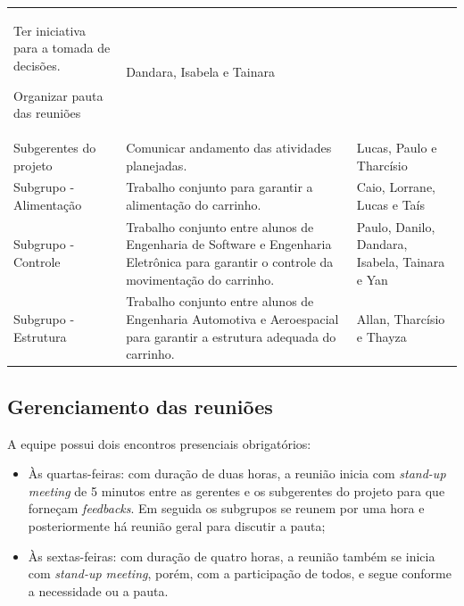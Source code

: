 \begin{table}[h]
{\begin{tabular}{ l l l }
{Ter iniciativa para a tomada de decisões.  			

Organizar pauta das reuniões } &
    \multicolumn{1}{p{2.417cm}|}{Dandara, Isabela e Tainara}
  \\  
  \cline{1-1}\cline{2-2}\cline{3-3}  
    \multicolumn{1}{|p{2.567cm}|}{Subgerentes do projeto} &
    \multicolumn{1}{p{6.433cm}|}{Comunicar andamento das atividades planejadas.} &
    \multicolumn{1}{p{2.417cm}|}{Lucas, Paulo e Tharcísio}
  \\  
  \cline{1-1}\cline{2-2}\cline{3-3}  
    \multicolumn{1}{|p{2.567cm}|}{Subgrupo - Alimentação} &
    \multicolumn{1}{p{6.433cm}|}{Trabalho conjunto para garantir a alimentação do carrinho.} &
    \multicolumn{1}{p{2.417cm}|}{Caio, Lorrane, Lucas e Taís}
  \\  
  \cline{1-1}\cline{2-2}\cline{3-3}  
    \multicolumn{1}{|p{2.567cm}|}{Subgrupo - Controle} &
    \multicolumn{1}{p{6.433cm}|}{Trabalho conjunto entre alunos de Engenharia de Software e Engenharia Eletrônica para garantir o controle da movimentação do carrinho. } &
    \multicolumn{1}{p{2.417cm}|}{Paulo, Danilo, Dandara, Isabela, Tainara e Yan}
  \\  
  \cline{1-1}\cline{2-2}\cline{3-3}  
    \multicolumn{1}{|p{2.567cm}|}{Subgrupo - Estrutura} &
    \multicolumn{1}{p{6.433cm}|}{Trabalho conjunto entre alunos de Engenharia Automotiva e Aeroespacial para garantir a estrutura adequada do carrinho.} &
    \multicolumn{1}{p{2.417cm}|}{Allan, Tharcísio e Thayza}
  \\  
  \hline

 \end{tabular} }
\end{table}

\newpage

\subsection{Gerenciamento das reuniões}

A equipe possui dois encontros presenciais obrigatórios:

\begin{itemize}
  \item Às quartas-feiras: com duração de duas horas, a reunião inicia com \textit{stand-up meeting} de 5 minutos entre as gerentes e os subgerentes do projeto para que forneçam \textit{feedbacks}. Em seguida os subgrupos se reunem por uma hora e posteriormente há reunião geral para discutir a pauta;
  \item Às sextas-feiras: com duração de quatro horas, a reunião também se inicia com \textit{stand-up meeting}, porém, com a participação de todos, e segue conforme a necessidade ou a pauta.
\end{itemize}

